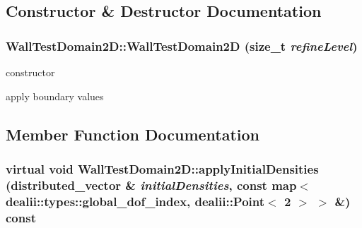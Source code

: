 \subsection{Constructor \& Destructor Documentation}
\hypertarget{classWallTestDomain2D_ae2a5588bd00b23f67587f5030520daca}{
\subsubsection[{WallTestDomain2D}]{\setlength{\rightskip}{0pt plus 5cm}WallTestDomain2D::WallTestDomain2D (size\_\-t {\em refineLevel})}}
\label{classWallTestDomain2D_ae2a5588bd00b23f67587f5030520daca}


constructor 

apply boundary values 

\subsection{Member Function Documentation}
\hypertarget{classWallTestDomain2D_af8d57a6c29029514a2f2d09547f7fba1}{
\subsubsection[{applyInitialDensities}]{\setlength{\rightskip}{0pt plus 5cm}virtual void WallTestDomain2D::applyInitialDensities (distributed\_\-vector \& {\em initialDensities}, \/  const map$<$ dealii::types::global\_\-dof\_\-index, dealii::Point$<$ 2 $>$ $>$ \&) const}}
\label{classWallTestDomain2D_af8d57a6c29029514a2f2d09547f7fba1}


